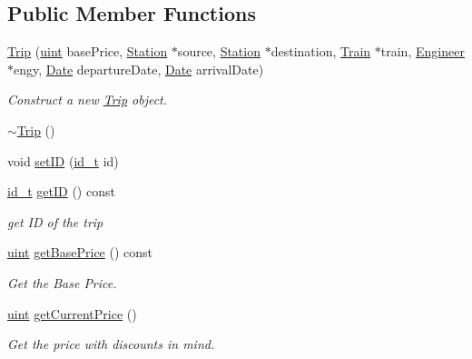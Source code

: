 \subsection*{Public Member Functions}
\begin{DoxyCompactItemize}
\item 
\mbox{\hyperlink{classTrip_ab25669acad521c66612a118ae64d71f5}{Trip}} (\mbox{\hyperlink{project__utils_8h_a91ad9478d81a7aaf2593e8d9c3d06a14}{uint}} base\+Price, \mbox{\hyperlink{classStation}{Station}} $\ast$source, \mbox{\hyperlink{classStation}{Station}} $\ast$destination, \mbox{\hyperlink{classTrain}{Train}} $\ast$train, \mbox{\hyperlink{classEngineer}{Engineer}} $\ast$engy, \mbox{\hyperlink{classDate}{Date}} departure\+Date, \mbox{\hyperlink{classDate}{Date}} arrival\+Date)
\begin{DoxyCompactList}\small\item\em Construct a new \mbox{\hyperlink{classTrip}{Trip}} object. \end{DoxyCompactList}\item 
\mbox{\hyperlink{classTrip_a2376daed3b03469163782ef0d0533d52}{$\sim$\+Trip}} ()
\item 
void \mbox{\hyperlink{classTrip_a15be60d61cf9fb7dc3e18e6cebedb27e}{set\+ID}} (\mbox{\hyperlink{project__utils_8h_a8f3a969054ad2200720b96e7e23dd4e1}{id\+\_\+t}} id)
\item 
\mbox{\hyperlink{project__utils_8h_a8f3a969054ad2200720b96e7e23dd4e1}{id\+\_\+t}} \mbox{\hyperlink{classTrip_a7770a61e1211789c80b003eeedcaa09c}{get\+ID}} () const
\begin{DoxyCompactList}\small\item\em get ID of the trip \end{DoxyCompactList}\item 
\mbox{\hyperlink{project__utils_8h_a91ad9478d81a7aaf2593e8d9c3d06a14}{uint}} \mbox{\hyperlink{classTrip_af2a3a9f9e33b9dd31e9193cf48bec134}{get\+Base\+Price}} () const
\begin{DoxyCompactList}\small\item\em Get the Base Price. \end{DoxyCompactList}\item 
\mbox{\hyperlink{project__utils_8h_a91ad9478d81a7aaf2593e8d9c3d06a14}{uint}} \mbox{\hyperlink{classTrip_a9006732aa32a2b098538d48b63f2d276}{get\+Current\+Price}} ()
\begin{DoxyCompactList}\small\item\em Get the price with discounts in mind. \end{DoxyCompactList}\item 

\end{DoxyCompactItemize}
